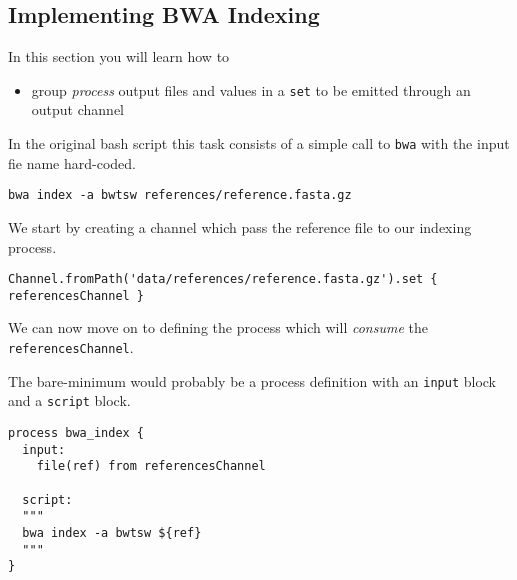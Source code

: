\subsection{Implementing BWA Indexing}


In this section you will learn how to

\begin{itemize}
 \item  group \emph{process} output files and values in a \texttt{set} to be emitted through an output channel
\end{itemize}

In the original bash script this task consists of a simple call to \texttt{bwa} with 
the input fie name hard-coded. %

\begin{lstlisting}
bwa index -a bwtsw references/reference.fasta.gz
\end{lstlisting}

We start by creating a channel which pass the reference file to our indexing process. 

\begin{lstlisting}
Channel.fromPath('data/references/reference.fasta.gz').set { referencesChannel } 
\end{lstlisting}

We can now move on to defining the process which will \emph{consume} the \texttt{referencesChannel}.

The bare-minimum would probably be a process definition with 
an \texttt{input} block and a \texttt{script} block.

\begin{lstlisting}
process bwa_index {
  input:
    file(ref) from referencesChannel

  script:
  """
  bwa index -a bwtsw ${ref}
  """
}
\end{lstlisting}



%
%
%
%    

